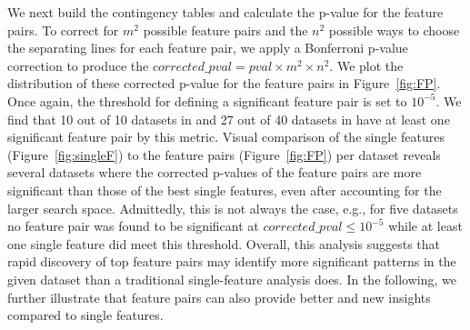  We next build the contingency tables and calculate the p-value for the \topk feature pairs. To correct for $m^2$ possible feature pairs and the $n^2$ possible ways to choose the separating lines for each feature pair, we apply a Bonferroni p-value correction to produce the $ corrected\_pval = pval\times m^2 \times n^2$. We plot the distribution of these corrected p-value for the \topk feature pairs in Figure~\ref{fig:FP}. Once again, the threshold for defining a significant feature pair is set to $10^{-5}$. We find that 10 out of 10 datasets in \msig and 27 out of 40 datasets in \lincs have at least one significant feature pair by this metric. Visual comparison of the \tophundred single features (Figure~\ref{fig:singleF}) to the \tophundred feature pairs (Figure~\ref{fig:FP}) per dataset reveals several datasets where the
corrected p-values of the feature pairs are more significant than those of the best single features, even after accounting for the larger search space. Admittedly, this is not always the case, e.g., for five \lincs datasets no feature pair was found to be significant at $ corrected\_pval \leq 10^{-5}$ while at least one single feature did meet this threshold. Overall, this analysis suggests that rapid discovery of top feature pairs may identify more significant patterns in the given dataset than a traditional single-feature analysis does.
In the following, we further illustrate that feature pairs can also provide better and new insights compared to single features.

